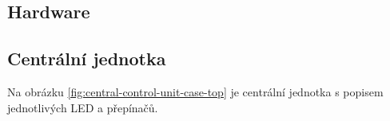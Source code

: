 \begin{Czech}
\section{Hardware}
\end{Czech}

\begin{Czech}
\subsection{Centrální jednotka}
\end{Czech}

\begin{Czech}
Na obrázku \ref{fig:central-control-unit-case-top} je centrální jednotka s popisem jednotlivých LED a přepínačů.
\end{Czech}

